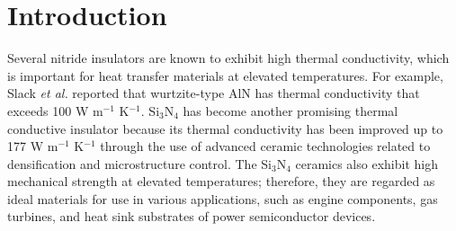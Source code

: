 \documentclass[twocolumn,amsmath,amssymb,a4paper,prb,superscriptaddress,floatfix]{revtex4-1}
\begin{document}
\section{Introduction}
Several nitride insulators are known to exhibit high thermal conductivity, which
is important for heat transfer materials at elevated temperatures. For example,
Slack {\it et al.}\cite{slack} reported that wurtzite-type AlN has thermal
conductivity that exceeds 100 W m$^{-1}$ K$^{-1}$. Si$_3$N$_4$ has become another
promising thermal conductive insulator because its thermal conductivity has been
improved up to 177 W m$^{-1}$ K$^{-1}$ through the use of advanced ceramic technologies
related to densification and microstructure
control.\cite{zhou,hirao-rev,watari,hirosaki} The Si$_3$N$_4$ ceramics
also exhibit high mechanical strength at elevated temperatures; therefore, they are
regarded as ideal materials for use in various applications, such as engine
components, gas turbines, and heat sink substrates of power semiconductor
devices.
\end{document}
